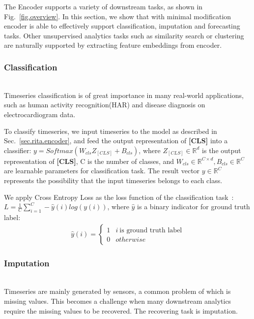 \begin{sloppypar}
The \system Encoder supports a variety of downstream tasks, as shown in Fig.~\ref{fig.overview}. In this section, we show that with minimal modification \system encoder is able to effectively support classification, imputation and forecasting tasks. 
Other unsupervised analytics tasks such as similarity search or clustering are naturally supported by extracting feature embeddings from \system encoder.

\subsubsection{Classification\nopunct}\ \\
Timeseries classification is of great importance in many real-world applications, such as human activity recognition(HAR) and disease diagnosis on electrocardiogram data.

To classify timeseries, we input timeseries to the model as described in Sec.~\ref{sec.rita.encoder}, and feed the output representation of \textbf{[CLS]} into a classifier: $\mathit{y=Softmax(W_{cls}Z_{[CLS]}+B_{cls})}$, where $Z_{[CLS]}\in \mathbb{R}^d$ is the output representation of \textbf{[CLS]}, C is the number of classes, and $\mathit{W_{cls} \in \mathbb{R}^{C \times d}, B_{cls} \in \mathbb{R}^{C}}$ are learnable parameters for classification task. 
The result vector $y\in \mathbb{R}^{C}$ represents the possibility that the input timeseries belongs to each class.

We apply Cross Entropy Loss as the loss function of the classification task~\cite{cox1958regression}:
$\mathit{L=\frac{1}{C}\sum_{i=1}^C -\hat{y}(i)log(y(i))}$, where $\hat{y}$ is a binary indicator for ground truth label:
\vspace{-1mm}
\begin{eqnarray}
\hat{y}(i) =
\begin{cases}
1   & i\  \text{is ground truth label} \\
0   & otherwise
\end{cases}
\end{eqnarray}

\subsubsection{Imputation\nopunct}\ \\
\label{sec.transformer.imputation}
Timeseries are mainly generated by sensors, a common problem of which is missing values. This becomes a challenge when many downstream analytics require the missing values to be recovered. The recovering task is imputation. 


\end{sloppypar}
